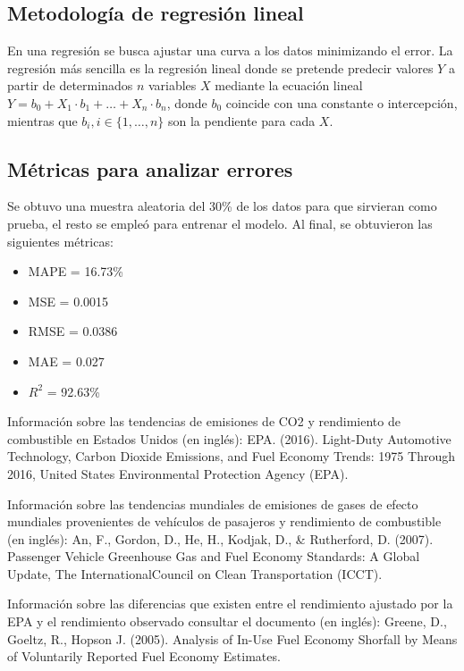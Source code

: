 \documentclass{article}
\begin{document}
\subsection{Metodología de regresión lineal}

En una regresión se busca ajustar una curva a los datos minimizando el error. La regresión más sencilla es la regresión lineal donde se pretende predecir valores $Y$ a partir de determinados $n$ variables $X$ mediante la ecuación lineal $Y = b_0 + X_1 \cdot b_1 + \ldots + X_n \cdot b_n$, donde $b_0$ coincide con una constante o intercepción, mientras que $b_i, i \in \{1, \ldots, n\}$ son la pendiente para cada $X$.

\subsection{Métricas para analizar errores}

Se obtuvo una muestra aleatoria del 30\% de los datos para que sirvieran como prueba, el resto se empleó para entrenar el modelo. Al final, se obtuvieron las siguientes métricas:

\begin{itemize}
    \item MAPE = 16.73\%
    \item MSE = 0.0015
    \item RMSE = 0.0386
    \item MAE = 0.027
    \item $R^2$ = 92.63\%
\end{itemize}




Información sobre las tendencias de emisiones de CO2 y rendimiento de combustible en Estados Unidos (en inglés):
EPA. (2016). Light-Duty Automotive Technology, Carbon Dioxide Emissions, and Fuel Economy Trends: 1975 Through 2016, United States Environmental Protection Agency (EPA).

Información sobre las tendencias mundiales de emisiones de gases de efecto mundiales provenientes de vehículos de pasajeros y rendimiento de combustible (en inglés):
An, F., Gordon, D., He, H., Kodjak, D., \& Rutherford, D. (2007). Passenger Vehicle Greenhouse Gas and Fuel Economy Standards: A Global Update, The InternationalCouncil on Clean Transportation (ICCT).

Información sobre las diferencias que existen entre el rendimiento ajustado por la EPA y el rendimiento observado consultar el documento (en inglés):
Greene, D., Goeltz, R., Hopson J. (2005). Analysis of In-Use Fuel Economy Shorfall by Means of Voluntarily Reported Fuel Economy Estimates.
\end{document}
